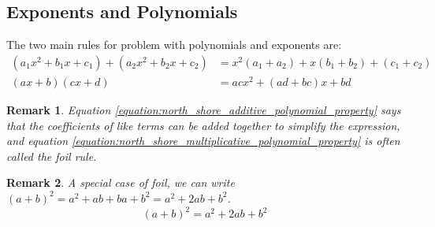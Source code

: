 \documentclass{article}
\theoremstyle{mystyle}
\newtheorem{remark}{Remark}[section]
\begin{document}
\subsection{Exponents and Polynomials}
The two main rules for problem with polynomials and exponents are:
\begin{align}
    (a_1 x^2 + b_1 x + c_1) + (a_2 x^2 + b_2 x + c_2) &= x^2(a_1+a_2) + x (b_1+b_2) + (c_1+c_2)\label{equation:north_shore_additive_polynomial_property}\\
    (ax+b)(cx+d) &= acx^2 + (ad+bc)x + bd\label{equation:north_shore_multiplicative_polynomial_property}
\end{align}
\begin{remark}
Equation \ref{equation:north_shore_additive_polynomial_property} says that the coefficients of like terms can be added together to simplify the expression, and equation \ref{equation:north_shore_multiplicative_polynomial_property} is often called the \gls{foil} rule.
\end{remark}
\begin{remark}
\label{remark:north_shore_square_of_a_sum_foil}
A special case of \gls{foil}, we can write $(a+b)^2 = a^2+ab+ba+b^2 = a^2+2ab+b^2$.
\begin{equation}
\label{equation:North_Shore_square_of_a_sum}
    (a+b)^2 = a^2+2ab+b^2
\end{equation}
\end{remark}
\end{document}

